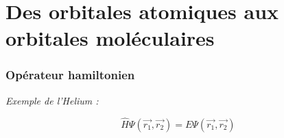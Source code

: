 \documentclass[../main.tex]{subfile}
\begin{document}
\part{Des orbitales atomiques aux orbitales moléculaires}

\section{Opérateur hamiltonien}

\emph{Exemple de l'Helium :}

$$\hat{H} \Psi(\vec{r_1}, \vec{r_2}) = E \Psi(\vec{r_1}, \vec{r_2})$$
\end{document}

